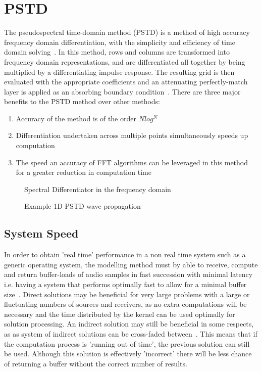 \documentclass{svproc}
\begin{document}
\newpage
\section{PSTD}
The pseudospectral time-domain method (PSTD) is a method of high accuracy frequency domain differentiation, with the simplicity and efficiency of time domain solving~\cite{Hornikx2016}. In this method, rows and columns are transformed into frequency domain representations, and are differentiated all together by being multiplied by a differentiating impulse response. The resulting grid is then evaluated with the appropriate coefficients and an attenuating perfectly-match layer is applied as an absorbing boundary condition~\cite{Angus2010}. There are three major benefits to the PSTD method over other methods:
\begin{enumerate}
\item Accuracy of the method is of the order $Nlog^N$
\item Differentiation undertaken across multiple points simultaneously speeds up computation
\item The speed an accuracy of FFT algorithms can be leveraged in this method for a greater reduction in computation time
\end{enumerate}

\begin{figure}
\centering
\caption{Spectral Differentiator in the frequency domain~\cite{Durbridg2016}}
\end{figure}
\begin{figure}
\centering
\caption{Example 1D PSTD wave propagation~\cite{Durbridg2016}}
\end{figure}

\subsection{System Speed}
In order to obtain 'real time' performance in a non real time system such as a generic operating system, the modelling method must by able to receive, compute and return buffer-loads of audio samples in fast succession with minimal latency~\cite{Pirkle2013} i.e. having a system that performs optimally fast to allow for a minimal buffer size~\cite{Microsoft2016}. Direct solutions may be beneficial for very large problems with a large or fluctuating numbers of sources and receivers, as no extra computations will be necessary and the time distributed by the kernel can be used optimally for solution processing. An indirect solution may still be beneficial in some respects, as as system of indirect solutions can be cross-faded between~\cite{Galvez2016}. This means that if the computation process is 'running out of time', the previous solution can still be used. Although this solution is effectively 'incorrect' there will be less chance of returning a buffer without the correct number of results.
\end{document}
